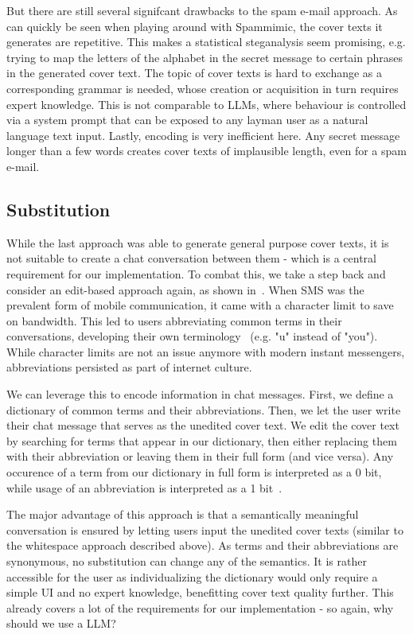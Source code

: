 But there are still several signifcant drawbacks to the spam e-mail approach. As can quickly be seen when playing around with Spammimic, the cover texts it generates are repetitive. This makes a statistical steganalysis seem promising, e.g. trying to map the letters of the alphabet in the secret message to certain phrases in the generated cover text. The topic of cover texts is hard to exchange as a corresponding grammar is needed, whose creation or acquisition in turn requires expert knowledge. This is not comparable to \glspl{LLM}, where behaviour is controlled via a system prompt that can be exposed to any layman user as a natural language text input. Lastly, encoding is very inefficient here. Any secret message longer than a few words creates cover texts of implausible length, even for a spam e-mail.

\subsection{Substitution}
\label{sec:substitution}
While the last approach was able to generate general purpose cover texts, it is not suitable to create a chat conversation between them - which is a central requirement for our implementation. To combat this, we take a step back and consider an edit-based approach again, as shown in~\cite{shirali-shahrezaTextSteganographySMS2007}. When \gls{SMS} was the prevalent form of mobile communication, it came with a character limit to save on bandwidth. This led to users abbreviating common terms in their conversations, developing their own terminology~\cite{shirali-shahrezaTextSteganographySMS2007} (e.g. "u" instead of "you"). While character limits are not an issue anymore with modern instant messengers, abbreviations persisted as part of internet culture.

We can leverage this to encode information in chat messages. First, we define a dictionary of common terms and their abbreviations. Then, we let the user write their chat message that serves as the unedited cover text. We edit the cover text by searching for terms that appear in our dictionary, then either replacing them with their abbreviation or leaving them in their full form (and vice versa). Any occurence of a term from our dictionary in full form is interpreted as a 0 bit, while usage of an abbreviation is interpreted as a 1 bit~\cite{shirali-shahrezaTextSteganographySMS2007}.

The major advantage of this approach is that a semantically meaningful conversation is ensured by letting users input the unedited cover texts (similar to the whitespace approach described above). As terms and their abbreviations are synonymous, no substitution can change any of the semantics. It is rather accessible for the user as individualizing the dictionary would only require a simple \gls{UI} and no expert knowledge, benefitting cover text quality further. This already covers a lot of the requirements for our implementation - so again, why should we use a \gls{LLM}?

